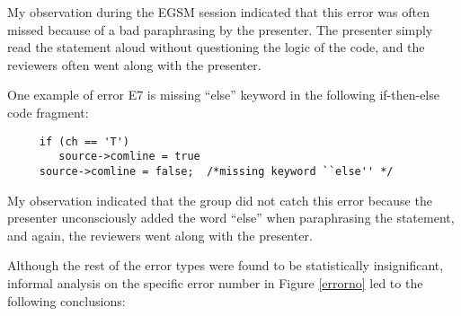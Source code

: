 My observation during the EGSM session indicated that
this error was often missed because of a bad paraphrasing by the
presenter. The presenter simply read the statement aloud without
questioning the logic of the code, and the reviewers often
went along with the presenter. %

One example of error E7 is missing ``else'' keyword in the following
if-then-else code fragment:
\small
\begin{verbatim}
     if (ch == 'T')
        source->comline = true
     source->comline = false;  /*missing keyword ``else'' */
\end{verbatim}
\normalsize

My observation indicated that the group did not catch this
error because the presenter unconsciously added the word ``else'' when
paraphrasing the statement, and again, the reviewers went along
with the presenter.  

Although the rest of the error types were found to be statistically
insignificant, informal analysis  on the specific error
number in Figure \ref{errorno} led to the following conclusions:

